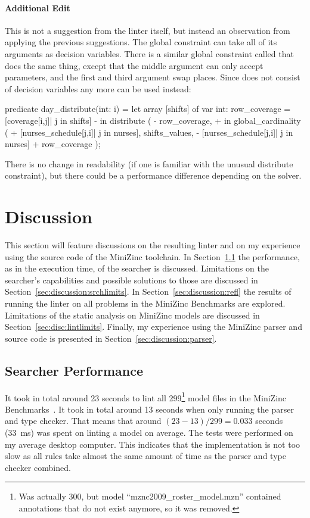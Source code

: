 \documentclass[a4paper,12pt]{article}
\begin{document}
\paragraph{Additional Edit}
\begin{sloppypar}
This is not a suggestion from the linter itself, but instead an
observation from applying the previous suggestions.
The global constraint  can take all of its
arguments as decision variables. There is a similar global constraint called
 that does the same thing, except that the middle argument can
only accept parameters, and the first and third argument swap places. Since
 does not consist of decision variables any more can
 be used instead:
\end{sloppypar}
\begin{mznnobreak}[style=diff]
predicate day_distribute(int: i) = let {
  array [shifts] of var int: row_coverage =
    [coverage[i,j]| j in shifts]
  }
- in distribute (
-   row_coverage,
+ in global_cardinality (
+   [nurses_schedule[j,i]| j in nurses],
    shifts_values,
-   [nurses_schedule[j,i]| j in nurses]
+   row_coverage
    );
\end{mznnobreak}
There is no change in readability (if one is familiar with the unusual distribute constraint),
but there could be a performance difference depending on the solver.

\section{Discussion}\label{sec:discussion}
This section will feature discussions on the resulting linter and on my experience
using the source code of the MiniZinc toolchain.
In Section~\ref{sec:discussion:searcher} the performance, as in the execution time, of the searcher is discussed.
Limitations on the searcher's capabilities and possible solutions to those are discussed in Section~\ref{sec:discussion:srchlimits}.
In Section~\ref{sec:discussion:refl} the results of running the linter on all problems in the MiniZinc Benchmarks are explored.
Limitations of the static analysis on MiniZinc models are discussed in Section~\ref{sec:disc:lintlimits}.
Finally, my experience using the MiniZinc parser and source code is presented in Section~\ref{sec:discussion:parser}.

\subsection{Searcher Performance}\label{sec:discussion:searcher}
It took in total around 23 seconds to lint all 299\footnote{Was actually 300, but model
  ``mznc2009\_roster\_model.mzn'' contained annotations that do not exist anymore, so it was
  removed.} model
files in the MiniZinc Benchmarks~\cite{mznbench}. It took in total around 13 seconds when
only running the parser and type checker. That means that around $(23-13)/299 = 0.033$
seconds (\SI{33}{\milli\second}) was spent on linting a model on average. The tests
were performed on my average desktop computer. This indicates that the implementation is
not too slow as all rules take almost the same amount of time as the parser and type checker combined.
\end{document}
